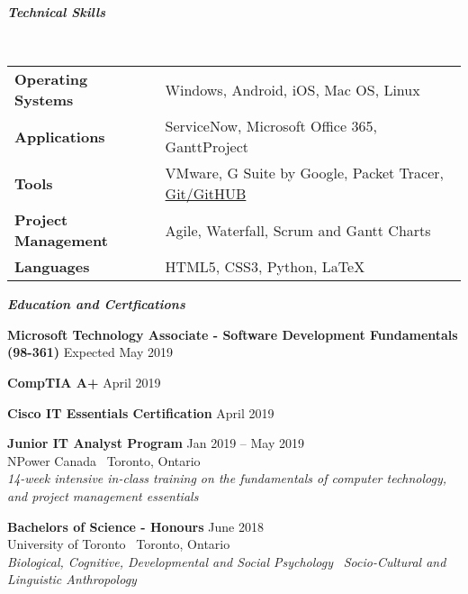 \documentclass{article}
\begin{document}
\smallskip

\begin{center}
 \large \textcolor{ablue}{\textit{\textbf{Technical Skills}}}
\end{center}

~\begin{tabular}{l l}
 
\textbf{Operating Systems} & Windows,  Android,  iOS, Mac OS,  Linux  \\
\textbf{Applications} & ServiceNow,  Microsoft Office 365, GanttProject  \\
\textbf{Tools} & VMware, G Suite by Google, Packet Tracer, \href{https://github.com/cecil-a}{Git/GitHUB} \\
\textbf{Project Management} & Agile, Waterfall, Scrum and Gantt Charts \\
\textbf{Languages} & HTML5,  CSS3,  Python, LaTeX\\

\end{tabular}

\bigskip

\begin{center}
 \large  \textcolor{ablue}{\textit{\textbf{Education and Certfications}}}
\end{center}

\begin{doublespacing}

\noindent \textbf{Microsoft Technology Associate - Software Development Fundamentals (98-361)}
\hfill Expected May 2019 

\noindent \textbf{CompTIA A+}    
\hfill April 2019

\noindent \textbf{Cisco IT Essentials Certification}
\hfill April 2019 

\begin{singlespacing}

\noindent \textbf{Junior IT Analyst Program} 
\hfill Jan 2019 – May 2019 
\\\noindent NPower Canada \textbar \ {Toronto, Ontario }
\\\noindent  \textit{14-week intensive in-class training on the fundamentals of computer technology, and project management essentials}

\end{singlespacing}

\begin{singlespacing}

\noindent \textbf{Bachelors of Science - Honours} 
\hfill June 2018 
\\\noindent University of Toronto \textbar \ Toronto, Ontario
\\\noindent \textit{Biological, Cognitive, Developmental and Social Psychology} \textbar  \  \textit{Socio-Cultural and Linguistic Anthropology}

\end{singlespacing}

\end{doublespacing}
\end{document}
